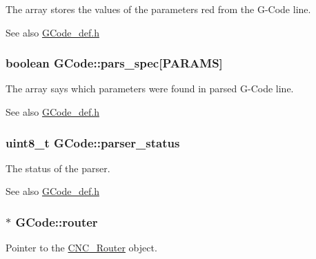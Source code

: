 The array stores the values of the parameters red from the G-\/\+Code line. 

\begin{DoxySeeAlso}{See also}
\hyperlink{_g_code__def_8h}{G\+Code\+\_\+def.\+h} 
\end{DoxySeeAlso}
\hypertarget{class_g_code_a6d11b02685ef1b387a3c9da004547006}{
\subsubsection[{pars\+\_\+spec}]{\setlength{\rightskip}{0pt plus 5cm}boolean G\+Code\+::pars\+\_\+spec\mbox{[}{\bf P\+A\+R\+A\+M\+S}\mbox{]}}}\label{class_g_code_a6d11b02685ef1b387a3c9da004547006}


The array says which parameters were found in parsed G-\/\+Code line. 

\begin{DoxySeeAlso}{See also}
\hyperlink{_g_code__def_8h}{G\+Code\+\_\+def.\+h} 
\end{DoxySeeAlso}
\hypertarget{class_g_code_a56d0e5e56115cd8e7b3f161cc8c0528e}{
\subsubsection[{parser\+\_\+status}]{\setlength{\rightskip}{0pt plus 5cm}uint8\+\_\+t G\+Code\+::parser\+\_\+status}}\label{class_g_code_a56d0e5e56115cd8e7b3f161cc8c0528e}


The status of the parser. 

\begin{DoxySeeAlso}{See also}
\hyperlink{_g_code__def_8h}{G\+Code\+\_\+def.\+h} 
\end{DoxySeeAlso}
\hypertarget{class_g_code_a8edb8e20bfa27ed777bedf9287043407}{
\subsubsection[{router}]{$\ast$ G\+Code\+::router}}\label{class_g_code_a8edb8e20bfa27ed777bedf9287043407}


Pointer to the \hyperlink{class_c_n_c___router}{C\+N\+C\+\_\+\+Router} object. 


